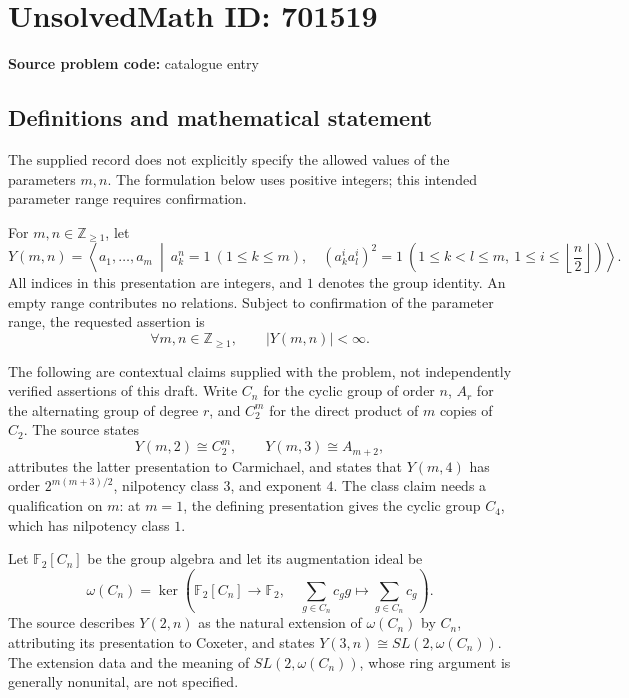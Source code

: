 \documentclass[11pt]{article}
\newcommand{\Z}{\mathbb{Z}}
\newcommand{\F}{\mathbb{F}}
\begin{document}
\section*{UnsolvedMath ID: 701519}
\textbf{Source problem code:} catalogue entry
\subsection{Definitions and mathematical statement}
The supplied record does not explicitly specify the allowed values of the parameters \(m,n\). The formulation below uses positive integers; this intended parameter range requires confirmation.

For \(m,n\in\Z_{\geq 1}\), let
\[
Y(m,n)=\left\langle a_1,\ldots,a_m\ \middle|\ a_k^n=1\ (1\leq k\leq m),\quad (a_k^i a_l^i)^2=1\ \left(1\leq k<l\leq m,\ 1\leq i\leq\left\lfloor\frac n2\right\rfloor\right)\right\rangle.
\]
All indices in this presentation are integers, and \(1\) denotes the group identity. An empty range contributes no relations. Subject to confirmation of the parameter range, the requested assertion is
\[
\forall m,n\in\Z_{\geq 1},\qquad |Y(m,n)|<\infty.
\]

The following are contextual claims supplied with the problem, not independently verified assertions of this draft. Write \(C_n\) for the cyclic group of order \(n\), \(A_r\) for the alternating group of degree \(r\), and \(C_2^m\) for the direct product of \(m\) copies of \(C_2\). The source states
\[
Y(m,2)\cong C_2^m,\qquad Y(m,3)\cong A_{m+2},
\]
attributes the latter presentation to Carmichael, and states that \(Y(m,4)\) has order \(2^{m(m+3)/2}\), nilpotency class \(3\), and exponent \(4\). The class claim needs a qualification on \(m\): at \(m=1\), the defining presentation gives the cyclic group \(C_4\), which has nilpotency class \(1\).

Let \(\F_2[C_n]\) be the group algebra and let its augmentation ideal be
\[
\omega(C_n)=\ker\!\left(\F_2[C_n]\longrightarrow\F_2,\quad \sum_{g\in C_n}c_g g\longmapsto\sum_{g\in C_n}c_g\right).
\]
The source describes \(Y(2,n)\) as the natural extension of \(\omega(C_n)\) by \(C_n\), attributing its presentation to Coxeter, and states \(Y(3,n)\cong SL(2,\omega(C_n))\). The extension data and the meaning of \(SL(2,\omega(C_n))\), whose ring argument is generally nonunital, are not specified.
\end{document}
